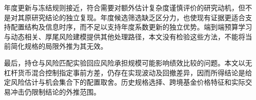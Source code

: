 年度更新与冻结规则接近，符合需要对额外估计复杂度谨慎评价的研究动机\cite{demiguel2009optimal}，但不是对其原研究结论的独立复现。年度候选筛选缺乏区分力，也使现有证据更适合支持配置结构及信息时序，而不足以支持年度系数更新的独立优势。端到端预算学习\cite{uysal2024endtoend}与动态相关、厚尾风险建模\cite{paolella2025riskparity}提供其他处理路径，本文没有检验这些方法，不能将当前简化规格的局限外推为其无效。

最后，持仓与风险匹配实验回应风险承担规模可能影响绩效比较的问题\cite{asness2012leverage,moreira2017volatility}。本文以无杠杆货币混合控制指定事前方差，仍存在实现波动及回撤差异，因而所得结论是给定风险估计与机会集合下的配置取舍。历史规格选择、跨境基金价格特征和实际交易冲击仍限制结论的外推范围。
